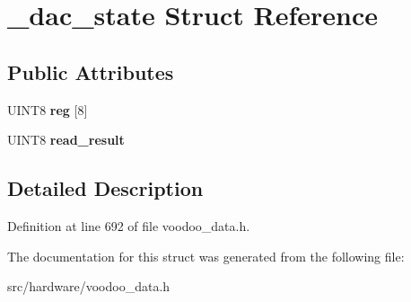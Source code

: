 \hypertarget{struct__dac__state}{\section{\-\_\-dac\-\_\-state Struct Reference}
\label{struct__dac__state}
}
\subsection*{Public Attributes}
\begin{DoxyCompactItemize}
\item 
\hypertarget{struct__dac__state_a1e4884b61290d29896d708cb51eb259a}{U\-I\-N\-T8 {\bfseries reg} \mbox{[}8\mbox{]}}\label{struct__dac__state_a1e4884b61290d29896d708cb51eb259a}

\item 
\hypertarget{struct__dac__state_ab575d8963291df88531e3300c4ab342e}{U\-I\-N\-T8 {\bfseries read\-\_\-result}}\label{struct__dac__state_ab575d8963291df88531e3300c4ab342e}

\end{DoxyCompactItemize}


\subsection{Detailed Description}


Definition at line 692 of file voodoo\-\_\-data.\-h.



The documentation for this struct was generated from the following file\-:\begin{DoxyCompactItemize}
\item 
src/hardware/voodoo\-\_\-data.\-h\end{DoxyCompactItemize}
